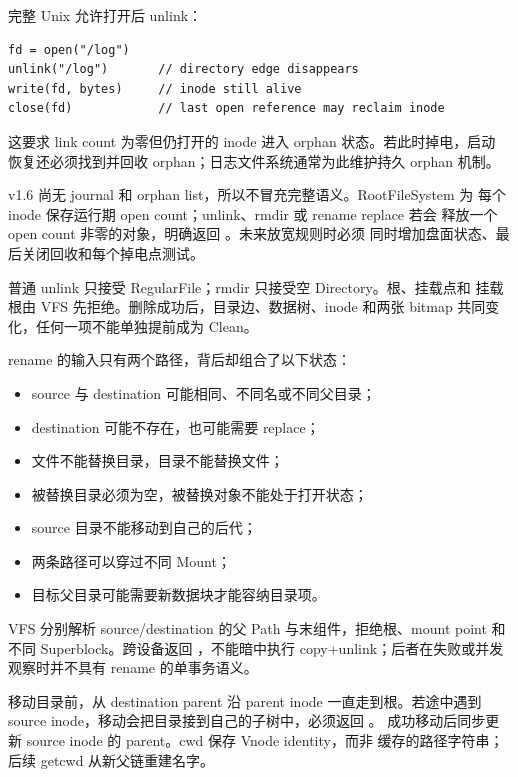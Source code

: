 完整 Unix 允许打开后 unlink：

\begin{lstlisting}[caption={成熟 Unix 中名字和打开生命周期分离}]
fd = open("/log")
unlink("/log")       // directory edge disappears
write(fd, bytes)     // inode still alive
close(fd)            // last open reference may reclaim inode
\end{lstlisting}

这要求 link count 为零但仍打开的 inode 进入 orphan 状态。若此时掉电，启动
恢复还必须找到并回收 orphan；日志文件系统通常为此维护持久 orphan 机制。

v1.6 尚无 journal 和 orphan list，所以不冒充完整语义。RootFileSystem 为
每个 inode 保存运行期 open count；unlink、rmdir 或 rename replace 若会
释放一个 open count 非零的对象，明确返回 。未来放宽规则时必须
同时增加盘面状态、最后关闭回收和每个掉电点测试。

普通 unlink 只接受 RegularFile；rmdir 只接受空 Directory。根、挂载点和
挂载根由 VFS 先拒绝。删除成功后，目录边、数据树、inode 和两张 bitmap
共同变化，任何一项不能单独提前成为 Clean。

rename 的输入只有两个路径，背后却组合了以下状态：

\begin{itemize}
  \item source 与 destination 可能相同、不同名或不同父目录；
  \item destination 可能不存在，也可能需要 replace；
  \item 文件不能替换目录，目录不能替换文件；
  \item 被替换目录必须为空，被替换对象不能处于打开状态；
  \item source 目录不能移动到自己的后代；
  \item 两条路径可以穿过不同 Mount；
  \item 目标父目录可能需要新数据块才能容纳目录项。
\end{itemize}

VFS 分别解析 source/destination 的父 Path 与末组件，拒绝根、mount point
和不同 Superblock。跨设备返回 ，不能暗中执行
copy+unlink；后者在失败或并发观察时并不具有 rename 的单事务语义。

移动目录前，从 destination parent 沿 parent inode 一直走到根。若途中遇到
source inode，移动会把目录接到自己的子树中，必须返回 。
成功移动后同步更新 source inode 的 parent。cwd 保存 Vnode identity，而非
缓存的路径字符串；后续 getcwd 从新父链重建名字。

